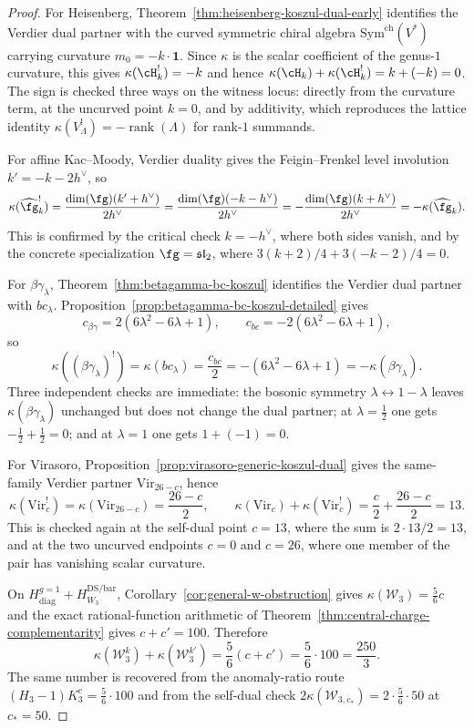 \begin{proof}
For Heisenberg, Theorem~\ref{thm:heisenberg-koszul-dual-early}
identifies the Verdier dual partner with the curved symmetric chiral
algebra $\mathrm{Sym}^{\mathrm{ch}}(V^*)$ carrying curvature
$m_0 = -k \cdot \mathbf{1}$. Since $\kappa$ is the scalar coefficient
of the genus-$1$ curvature, this gives
$\kappa(\cH_k^!) = -k$ and hence
$\kappa(\cH_k) + \kappa(\cH_k^!) = k + (-k) = 0$.
The sign is checked three ways on the witness locus:
directly from the curvature term, at the uncurved point $k=0$, and by
additivity, which reproduces the lattice identity
$\kappa(V_\Lambda^!) = -\operatorname{rank}(\Lambda)$ for rank-$1$
summands.

For affine Kac--Moody, Verdier duality gives the Feigin--Frenkel level
involution $k' = -k - 2h^\vee$, so
\[
 \kappa(\widehat{\fg}_k^!)
 =
 \frac{\dim(\fg)(k' + h^\vee)}{2h^\vee}
 =
 \frac{\dim(\fg)(-k-h^\vee)}{2h^\vee}
 =
 -\frac{\dim(\fg)(k+h^\vee)}{2h^\vee}
 =
 -\kappa(\widehat{\fg}_k).
\]
This is confirmed by the critical check $k=-h^\vee$, where both sides
vanish, and by the concrete specialization
$\fg=\mathfrak{sl}_2$, where
$3(k+2)/4 + 3(-k-2)/4 = 0$.

For $\beta\gamma_\lambda$, Theorem~\ref{thm:betagamma-bc-koszul}
identifies the Verdier dual partner with $bc_\lambda$.
Proposition~\ref{prop:betagamma-bc-koszul-detailed} gives
\[
 c_{\beta\gamma} = 2(6\lambda^2 - 6\lambda + 1),
 \qquad
 c_{bc} = -2(6\lambda^2 - 6\lambda + 1),
\]
so
\[
 \kappa((\beta\gamma_\lambda)^!)
 =
 \kappa(bc_\lambda)
 =
 \frac{c_{bc}}{2}
 =
 -(6\lambda^2 - 6\lambda + 1)
 =
 -\kappa(\beta\gamma_\lambda).
\]
Three independent checks are immediate: the bosonic symmetry
$\lambda \leftrightarrow 1-\lambda$ leaves
$\kappa(\beta\gamma_\lambda)$ unchanged but does not change the dual
partner; at $\lambda=\tfrac{1}{2}$ one gets
$-\tfrac{1}{2} + \tfrac{1}{2} = 0$; and at $\lambda=1$ one gets
$1 + (-1) = 0$.

For Virasoro, Proposition~\ref{prop:virasoro-generic-koszul-dual}
gives the same-family Verdier partner
$\mathrm{Vir}_{26-c}$, hence
\[
 \kappa(\mathrm{Vir}_c^!)
 =
 \kappa(\mathrm{Vir}_{26-c})
 =
 \frac{26-c}{2},
 \qquad
 \kappa(\mathrm{Vir}_c) + \kappa(\mathrm{Vir}_c^!)
 =
 \frac{c}{2} + \frac{26-c}{2}
 =
 13.
\]
This is checked again at the self-dual point $c=13$, where the sum is
$2 \cdot 13/2 = 13$, and at the two uncurved endpoints
$c=0$ and $c=26$, where one member of the pair has vanishing scalar
curvature.

On
$H_{\mathrm{diag}}^{g=1}+H_{W_3}^{\mathrm{DS/bar}}$,
Corollary~\ref{cor:general-w-obstruction} gives
$\kappa(\mathcal{W}_3) = \tfrac{5}{6}c$ and
the exact rational-function arithmetic of
Theorem~\ref{thm:central-charge-complementarity} gives
$c+c' = 100$.  Therefore
\[
 \kappa(\mathcal{W}_3^k) + \kappa(\mathcal{W}_3^{k'})
 =
 \frac{5}{6}(c+c')
 =
 \frac{5}{6}\cdot 100
 =
 \frac{250}{3}.
\]
The same number is recovered from the anomaly-ratio route
$(H_3-1)K_3^c = \tfrac{5}{6}\cdot 100$ and from the self-dual check
$2\kappa(\mathcal{W}_{3,c_*}) = 2 \cdot \tfrac{5}{6}\cdot 50$ at
$c_* = 50$.


\end{proof}
